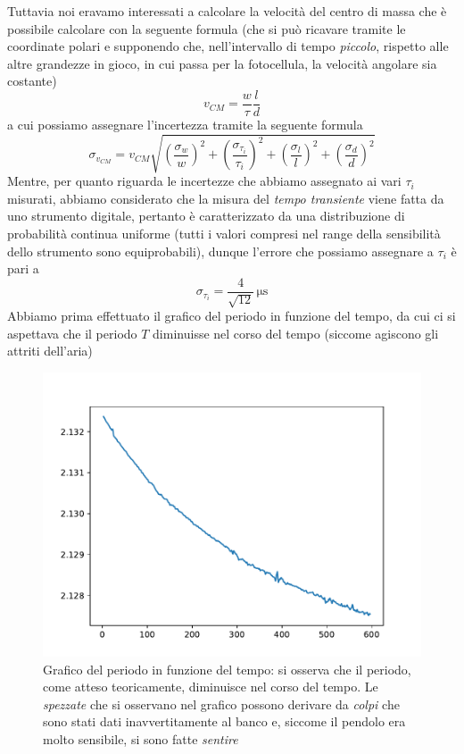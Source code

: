 \documentclass{article}
\begin{document}
\noindent Tuttavia noi eravamo interessati a calcolare la velocità del centro di massa che è possibile calcolare con la seguente formula (che si può ricavare tramite le coordinate polari e supponendo che, nell'intervallo di tempo \emph{piccolo}, rispetto alle altre grandezze in gioco, in cui passa per la fotocellula, la velocità angolare sia costante)
\begin{equation}
	v_{CM} = \frac{w}{\tau}\frac{l}{d}
\end{equation}
a cui possiamo assegnare l'incertezza tramite la seguente formula
\begin{equation}
	\sigma_{v_{CM}} = v_{CM} \sqrt{ \left( \frac{\sigma_w}{w} \right)^2 + \left( \frac{\sigma_{\tau_i}}{\tau_i} \right)^2 + \left( \frac{\sigma_l}{l} \right)^2 + \left( \frac{\sigma_d}{d} \right)^2}
\end{equation}
Mentre, per quanto riguarda le incertezze che abbiamo assegnato ai vari $\tau_i$ misurati, abbiamo considerato che la misura del \emph{tempo transiente} viene fatta da uno strumento digitale, pertanto è caratterizzato da una distribuzione di probabilità continua uniforme (tutti i valori compresi nel range della sensibilità dello strumento sono equiprobabili), dunque l'errore che possiamo assegnare a $\tau_i$ è pari a
$$
	\sigma_{\tau_i} = \frac{4}{\sqrt{12}} \, \si{\micro\second}
$$
Abbiamo prima effettuato il grafico del periodo in funzione del tempo, da cui ci si aspettava che il periodo $T$ diminuisse nel corso del tempo (siccome agiscono gli attriti dell'aria)
\begin{figure}[H]
	\centering
	\includegraphics[scale=0.45]{Grafico_periodo_tempo.pdf}
	\caption{Grafico del periodo in funzione del tempo: si osserva che il periodo, come atteso teoricamente, diminuisce nel corso del tempo. Le \emph{spezzate} che si osservano nel grafico possono derivare da \emph{colpi} che sono stati dati inavvertitamente al banco e, siccome il pendolo era molto sensibile, si sono fatte \emph{sentire} }
\end{figure}
\end{document}

